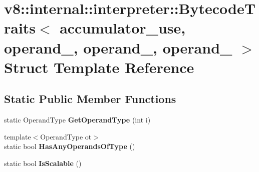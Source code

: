 \hypertarget{structv8_1_1internal_1_1interpreter_1_1_bytecode_traits_3_01accumulator__use_00_01operand__0_00_7bc7f22e039a5dadb0419dc05f939673}{}\section{v8\+:\+:internal\+:\+:interpreter\+:\+:Bytecode\+Traits$<$ accumulator\+\_\+use, operand\+\_, operand\+\_, operand\+\_ $>$ Struct Template Reference}
\label{structv8_1_1internal_1_1interpreter_1_1_bytecode_traits_3_01accumulator__use_00_01operand__0_00_7bc7f22e039a5dadb0419dc05f939673}
\subsection*{Static Public Member Functions}
\begin{DoxyCompactItemize}
\item 
static Operand\+Type {\bfseries Get\+Operand\+Type} (int i)\hypertarget{structv8_1_1internal_1_1interpreter_1_1_bytecode_traits_3_01accumulator__use_00_01operand__0_00_7bc7f22e039a5dadb0419dc05f939673_a37b83e658bd6da786040a0d1f5f104a4}{}\label{structv8_1_1internal_1_1interpreter_1_1_bytecode_traits_3_01accumulator__use_00_01operand__0_00_7bc7f22e039a5dadb0419dc05f939673_a37b83e658bd6da786040a0d1f5f104a4}

\item 
{\footnotesize template$<$Operand\+Type ot$>$ }\\static bool {\bfseries Has\+Any\+Operands\+Of\+Type} ()\hypertarget{structv8_1_1internal_1_1interpreter_1_1_bytecode_traits_3_01accumulator__use_00_01operand__0_00_7bc7f22e039a5dadb0419dc05f939673_addef0a173bcde0fa6ee5c46206b803b7}{}\label{structv8_1_1internal_1_1interpreter_1_1_bytecode_traits_3_01accumulator__use_00_01operand__0_00_7bc7f22e039a5dadb0419dc05f939673_addef0a173bcde0fa6ee5c46206b803b7}

\item 
static bool {\bfseries Is\+Scalable} ()\hypertarget{structv8_1_1internal_1_1interpreter_1_1_bytecode_traits_3_01accumulator__use_00_01operand__0_00_7bc7f22e039a5dadb0419dc05f939673_a06fe4b3361db5f6fbd31e6ecfb24497d}{}\label{structv8_1_1internal_1_1interpreter_1_1_bytecode_traits_3_01accumulator__use_00_01operand__0_00_7bc7f22e039a5dadb0419dc05f939673_a06fe4b3361db5f6fbd31e6ecfb24497d}

\end{DoxyCompactItemize}
